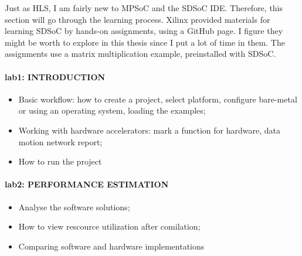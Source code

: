 Just as HLS, I am fairly new to MPSoC and the SDSoC IDE. Therefore, this section will go through the learning process. Xilinx provided materials for learning SDSoC by hands-on assignments, using a GitHub page. I figure they might be worth to explore in this thesis since I put a lot of time in them. The assignments use a matrix multiplication example, preinstalled with SDSoC.

\paragraph{lab1: INTRODUCTION}
\begin{itemize}
	\item Basic workflow: how to create a project, select platform, configure bare-metal or using an operating system, loading the examples;
	\item Working with hardware accelerators: mark a function for hardware, data motion network report;
	\item How to run the project
\end{itemize}

\paragraph{lab2: PERFORMANCE ESTIMATION} 
\begin{itemize}
	\item Analyse the software solutions;
	\item How to view rescource utilization after comilation; 
	\item Comparing software and hardware implementations
\end{itemize}

